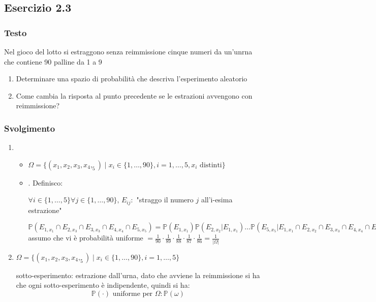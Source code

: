 \subsection{Esercizio 2.3}
\subsubsection{Testo}
Nel gioco del lotto si estraggono senza reimmissione cinque numeri da un'unrna che contiene 90 palline da 1 a 9
\begin{enumerate}
    \item Determinare una spazio di probabilità che descriva l'esperimento aleatorio
    \item Come cambia la risposta al punto precedente se le estrazioni avvengono con reimmissione?
\end{enumerate}

\subsubsection{Svolgimento}
\begin{enumerate}
    \item \begin{itemize}
        \item  $\Omega = \{(x_1, x_2, x_3, x_4,_5)\mid x_i\in \{1,\dots, 90\}, i=1,\dots,5, x_i \text{ distinti}\}$
        \item .
        Definisco:

        $\forall i\in\{1,\dots, 5\} \forall j\in \{1,\dots, 90\},\, E_{ij}:$ "straggo il numero $j$ all'i-esima estrazione" 

        $\mathbb{P}(E_{1,x_1}\cap E_{2,x_3}\cap E_{3,x_3}\cap E_{4,x_4}\cap E_{5,x_5})= \mathbb{P} (E_{1,x_1}) \mathbb{P}(E_{2,x_2}|E_{1,x_1}) \dots \mathbb{P}(E_{5,x_5} | E_{1,x_1}\cap E_{2,x_2}\cap E_{3,x_3} \cap E_{4,x_4} \cap E_{5,x_5})$ assumo che vi è probabilità uniforme $= \frac{1}{90}\cdot\frac{1}{89}\cdot \frac{1}{88}\cdot\frac{1}{87}\cdot\frac{1}{86} = \frac{1}{|\Omega|}$
    \end{itemize}
    
   

    \item $\Omega = \{(x_1, x_2, x_3, x_4,_5)\mid x_i\in \{1,\dots, 90\}, i=1,\dots,5\}$
    
    sotto-esperimento: estrazione dall'urna, dato che avviene la reimmissione si ha che ogni sotto-esperimento è indipendente, quindi si ha:
    \[
        \mathbb{P}(\cdot) \text{ uniforme per }\Omega: \mathbb{P}(\omega)
    \]
\end{enumerate}

